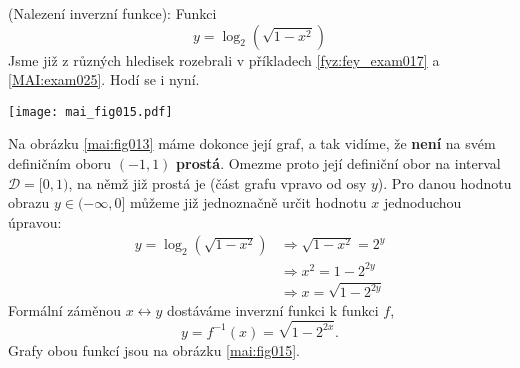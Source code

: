 \begin{mdframed}[style=mdexam]
  \begin{example}\label{MAI:exam027}
    (Nalezení inverzní funkce): Funkci 
    \begin{equation*}
      y = \log_2(\sqrt{1-x^2})
    \end{equation*}
    Jsme již z různých hledisek rozebrali v příkladech \ref{fyz:fey_exam017} a \ref{MAI:exam025}. 
    Hodí se i nyní.

    {\centering
    \captionsetup{type=figure}
    \texttt{[image: mai\_fig015.pdf]} 
    \par}
    
    Na obrázku \ref{mai:fig013} máme dokonce její graf, a tak vidíme, že \textbf{není} na svém 
    definičním oboru \((-1, 1)\) \textbf{prostá}. Omezme proto její definiční obor na interval 
    \(\mathcal{D} = [0, 1)\), na němž již prostá je (část grafu vpravo od osy \(y\)). Pro danou 
    hodnotu obrazu \(y \in (-\infty,0]\) můžeme již jednoznačně určit hodnotu \(x\) jednoduchou 
    úpravou:
    \begin{align*}
      y = \log_2(\sqrt{1-x^2}) &\Rightarrow \sqrt{1-x^2} = 2^y   \\
                               &\Rightarrow x^2 = 1 - 2^{2y}     \\
                               &\Rightarrow x = \sqrt{1 - 2^{2y}}
    \end{align*}
    Formální záměnou \(x \leftrightarrow y\) dostáváme inverzní funkci k funkci \(f\),
    \begin{equation*}
      y =f^{-1}(x) = \sqrt{1 - 2^{2x}}.
    \end{equation*}
    Grafy obou funkcí jsou na obrázku \ref{mai:fig015}.
  \end{example}
\end{mdframed}